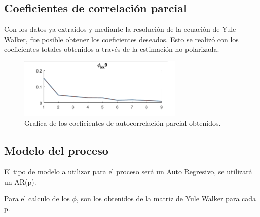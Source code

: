 \subsection{Coeficientes de correlación parcial}

Con los datos ya extraídos y mediante la resolución de la ecuación de Yule-Walker, fue posible obtener los coeficientes deseados. Esto se realizó con los coeficientes totales obtenidos a través de la estimación no polarizada.
\begin{figure}[H]
\centering
	\includegraphics[width=0.7\textwidth, trim = {0 0 0 0},clip]{./Imagenes/phikk.png}
	\caption{Grafica de los coeficientes de autocorrelación parcial obtenidos.}
	\label{fig:phikk}
\end{figure}


\subsection{Modelo del proceso}
\label{subsec:modelo}

El tipo de modelo a utilizar para el proceso será un Auto Regresivo, se utilizará un AR(p).

Para el calculo de los $\phi$, son los obtenidos de la matriz de Yule Walker para cada p.

